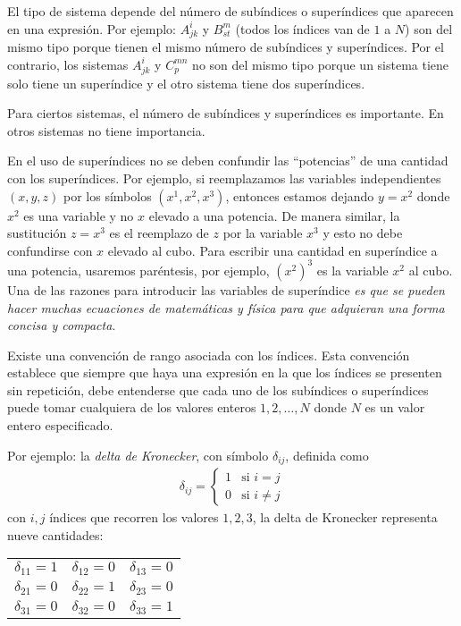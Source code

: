 \par
El tipo de sistema depende del número de subíndices o superíndices que aparecen en una expresión. Por ejemplo: $A_{jk}^{i}$ y $B_{st}^{m}$ (todos los índices van de $1$ a $N$) son del mismo tipo porque tienen el mismo número de subíndices y superíndices. Por el contrario, los sistemas $A_{jk}^{i}$ y $C_{p}^{mn}$ no son del mismo tipo porque un sistema tiene solo tiene un superíndice y el otro sistema tiene dos superíndices.
\par
Para ciertos sistemas, el número de subíndices y superíndices es importante. En otros sistemas no tiene importancia.
\par
En el uso de superíndices no se deben confundir las \enquote{potencias} de una cantidad con los superíndices. Por ejemplo, si reemplazamos las variables independientes $(x, y, z)$ por los símbolos $(x^{1}, x^{2}, x^{3})$, entonces estamos dejando $y = x^{2}$ donde $x^{2}$ es una variable y no $x$ elevado a una potencia. De manera similar, la sustitución $z = x^{3}$ es el reemplazo de $z$ por la variable $x^{3}$ y esto no debe confundirse con $x$ elevado al cubo. Para escribir una cantidad en superíndice a una potencia, usaremos paréntesis, por ejemplo, $(x^{2})^{3}$ es la variable $x^{2}$ al cubo. Una de las razones para introducir las variables de superíndice \emph{es que se pueden hacer muchas ecuaciones de matemáticas y física para que adquieran una forma concisa y compacta}.
\par
Existe una convención de rango asociada con los índices. Esta convención establece que siempre que haya una expresión en la que los índices se presenten sin repetición, debe entenderse que cada uno de los subíndices o superíndices puede tomar cualquiera de los valores enteros $1,2, \ldots, N$ donde $N$ es un valor entero especificado.
\par
Por ejemplo: la \emph{delta de Kronecker}, con símbolo $\delta_{ij}$, definida como
\begin{align*}
\delta_{ij} = \begin{cases}
1 & \mbox{si } i = j \\[0.5em]
0 & \mbox{si } i \neq j
\end{cases}
\end{align*}
con $i, j$ índices que recorren los valores $1, 2, 3$, la delta de Kronecker representa nueve cantidades:
\begin{table}[H]
\large
\centering
\begin{tabular}{c c c}
$\delta_{11} = 1$ & $\delta_{12} = 0$ & $\delta_{13} = 0$ \\
$\delta_{21} = 0$ & $\delta_{22} = 1$ & $\delta_{23} = 0$ \\
$\delta_{31} = 0$ & $\delta_{32} = 0$ & $\delta_{33} = 1$
\end{tabular}
\end{table}
